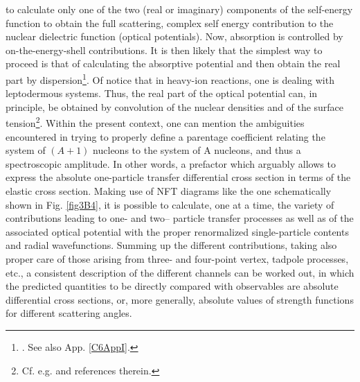 to calculate only one of the two (real or imaginary)
components of the self-energy function to obtain the
full scattering, complex self energy contribution to the nuclear dielectric function
(optical potentials). Now, absorption is controlled
by on-the-energy-shell contributions. It is then likely that the simplest way to proceed is
that of calculating the absorptive potential and then
obtain the real part by dispersion\footnote{\cite{Mahaux:85}. See also App. \ref{C6AppI}.}. Of notice that in heavy-ion reactions,
one is dealing with leptodermous systems. Thus, the
real part of the optical potential can, in principle, be
obtained by convolution of the nuclear densities and
of the surface tension\footnote{Cf. e.g. \cite{Broglia:04a} and references therein.}. Within the present context, one can mention the
ambiguities encountered in trying to properly define
a parentage coefficient relating the system of $(A +
1)$ nucleons to the system of A nucleons, and thus
a spectroscopic amplitude. In other words, a prefactor which arguably allows to express the absolute one-particle transfer differential
cross section in terms of the elastic cross section.
Making use of NFT diagrams like the one schematically shown
in Fig. \ref{fig3B4}, it is possible to calculate, one at a time,
the variety of contributions leading to one- and two-- particle
transfer processes as well as of the associated optical potential with the proper renormalized single-particle contents and radial wavefunctions. Summing up the different
contributions, taking also proper care of those arising
from three- and four-point vertex, tadpole processes, etc., a
consistent description of the different channels can be
worked out, in which the predicted quantities to be
directly compared with observables are absolute differential
cross sections, or, more generally, absolute
values of strength functions for different scattering
angles.
